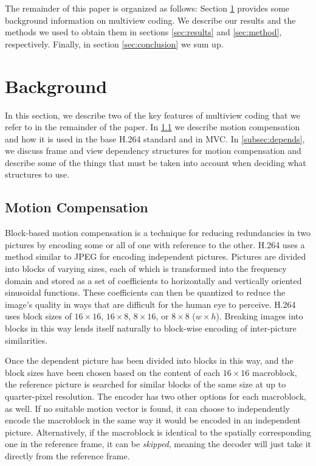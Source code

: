 \documentclass{sig-alternate-05-2015}
\begin{document}
The remainder of this paper is organized as follows: Section
\ref{sec:background} provides some background information on multiview coding.
We describe our results and the methods we used to obtain them in sections
\ref{sec:results} and \ref{sec:method}, respectively. Finally, in section
\ref{sec:conclusion} we sum up.

\section{Background} %
\label{sec:background} %

In this section, we describe two of the key features of multiview coding that
we refer to in the remainder of the paper. In \ref{subsec:motion} we
describe motion compensation and how it is used in the base H.264 standard and
in MVC. In \ref{subsec:depends}, we discuss frame and view dependency
structures for motion compensation and describe some of the things that must  be
taken into account when deciding what structures to use.

\subsection{Motion Compensation}
\label{subsec:motion}

Block-based motion compensation is a technique for reducing redundancies in two
pictures by encoding some or all of one with reference to the other. H.264 uses
a method similar to JPEG for encoding independent pictures. Pictures are divided
into blocks of varying sizes, each of which is transformed into the frequency
domain and stored as a set of coefficients to horizontally and vertically
oriented sinusoidal functions. These coefficients can then be quantized
to reduce the image's quality in ways that are difficult for the human eye to
perceive. H.264 uses block sizes of $16\times 16$, $16\times 8$, $8\times 16$,
or $8\times 8$ ($w\times h$). Breaking images into blocks in this way lends
itself naturally to block-wise encoding of inter-picture similarities.

Once the dependent picture has been divided into blocks in this way, and the
block sizes have been chosen based on the content of each $16\times 16$
macroblock, the reference picture is searched for similar blocks of the same
size at up to quarter-pixel resolution. The encoder has two other options for
each macroblock, as well. If no suitable motion vector is found, it can choose
to independently encode the macroblock in the same way it would be encoded in an
independent picture. Alternatively, if the macroblock is identical to the
spatially corresponding one in the reference frame, it can be {\it skipped},
meaning the decoder will just take it directly from the reference frame.
\end{document}
